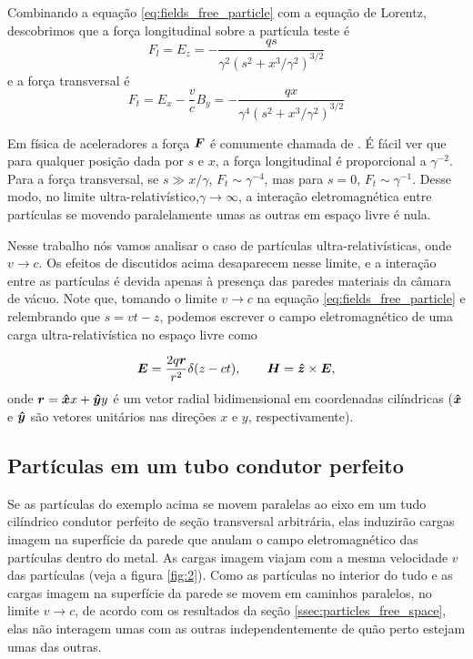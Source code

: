 Combinando a equação \ref{eq:fields_free_particle} com a equação de Lorentz, descobrimos que a força longitudinal sobre a partícula teste é
\begin{equation}
 F_l = E_z = -\frac{qs}{\gamma^2\left(s^2+x^3/\gamma^2\right)^{3/2}}
\end{equation}
 e a força transversal é 
 \begin{equation}
  F_t = E_x - \frac{v}{c}B_y = -\frac{qx}{\gamma^4\left(s^2+x^3/\gamma^2\right)^{3/2}}
 \end{equation}
 
Em física de aceleradores a força $\boldsymbol{F}$ é comumente chamada de .
É fácil ver que para qualquer posição dada por $s$ e $x$, a força longitudinal é proporcional a $\gamma^{-2}$. Para a força transversal, se $s \gg x/\gamma$, $F_t \sim \gamma^{-4}$, mas para $s=0$, $F_t \sim \gamma^{-1}$. Desse modo, no limite ultra-relativístico,$\gamma \to \infty$, a interação eletromagnética entre partículas se movendo paralelamente umas as outras em espaço livre é nula.

Nesse trabalho nós vamos analisar o caso de partículas ultra-relativísticas, onde $v \to c$. Os efeitos de  discutidos acima desaparecem nesse limite, e a interação entre as partículas é devida apenas à presença das paredes materiais da câmara de vácuo.
Note que, tomando o limite $v \to c$ na equação \ref{eq:fields_free_particle} e relembrando que $s = vt - z$, podemos escrever o campo eletromagnético de uma carga ultra-relativística no espaço livre como

\begin{equation}
\boldsymbol{E} = \frac{2q\boldsymbol{r}}{r^2}\delta(z-ct),\quad \quad \boldsymbol{H} =\boldsymbol{\hat{z}}\times\boldsymbol{E},
\end{equation}
onde $\boldsymbol{r} = \boldsymbol{\hat{x}}x + \boldsymbol{\hat{y}}y$ é um vetor radial bidimensional em coordenadas cilíndricas ($\boldsymbol{\hat{x}}$ e $\boldsymbol{\hat{y}}$ são vetores unitários nas direções $x$ e $y$, respectivamente).

\subsection{Partículas em um tubo condutor perfeito}

Se as partículas do exemplo acima se movem paralelas ao eixo em um tudo cilíndrico condutor perfeito de seção transversal arbitrária, elas induzirão cargas imagem na superfície da parede que anulam o campo eletromagnético das partículas dentro do metal. As cargas imagem viajam com a mesma velocidade $v$ das partículas (veja a figura \ref{fig:2}). Como as partículas no interior do tudo e as cargas imagem na superfície da parede se movem em caminhos paralelos, no limite $v\to c$, de acordo com os resultados da seção \ref{ssec:particles_free_space}, elas não interagem umas com as outras independentemente de quão perto estejam umas das outras.

